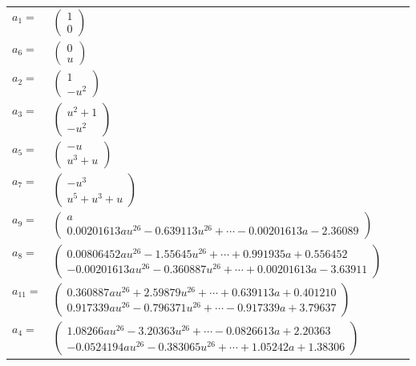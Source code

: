 \documentclass[1p]{elsarticle_modified}
\theoremstyle{definition}
\begin{document}
\begin{tabular}{m{7pt} m{180pt} m{7pt} m{180pt} }
\flushright $a_{1}=$&$\begin{pmatrix}1\\0\end{pmatrix}$ \\
\flushright $a_{6}=$&$\begin{pmatrix}0\\u\end{pmatrix}$ \\
\flushright $a_{2}=$&$\begin{pmatrix}1\\- u^2\end{pmatrix}$ \\
\flushright $a_{3}=$&$\begin{pmatrix}u^2+1\\- u^2\end{pmatrix}$ \\
\flushright $a_{5}=$&$\begin{pmatrix}- u\\u^3+u\end{pmatrix}$ \\
\flushright $a_{7}=$&$\begin{pmatrix}- u^3\\u^5+u^3+u\end{pmatrix}$ \\
\flushright $a_{9}=$&$\begin{pmatrix}a\\0.00201613 a u^{26}-0.639113 u^{26}+\cdots-0.00201613 a-2.36089\end{pmatrix}$ \\
\flushright $a_{8}=$&$\begin{pmatrix}0.00806452 a u^{26}-1.55645 u^{26}+\cdots+0.991935 a+0.556452\\-0.00201613 a u^{26}-0.360887 u^{26}+\cdots+0.00201613 a-3.63911\end{pmatrix}$ \\
\flushright $a_{11}=$&$\begin{pmatrix}0.360887 a u^{26}+2.59879 u^{26}+\cdots+0.639113 a+0.401210\\0.917339 a u^{26}-0.796371 u^{26}+\cdots-0.917339 a+3.79637\end{pmatrix}$ \\
\flushright $a_{4}=$&$\begin{pmatrix}1.08266 a u^{26}-3.20363 u^{26}+\cdots-0.0826613 a+2.20363\\-0.0524194 a u^{26}-0.383065 u^{26}+\cdots+1.05242 a+1.38306\end{pmatrix}$ \\

\end{tabular}
\end{document}

